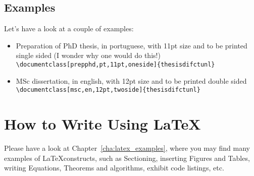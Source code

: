 \subsection{Examples} %
\label{ssec:examples}

Let's have a look at a couple of examples:

\begin{itemize}
	\item Preparation of PhD thesis, in portuguese, with 11pt size and to be printed single sided (I wonder why one would do this!)\\
	\verb!\documentclass[prepphd,pt,11pt,oneside]{thesisdifctunl}!
	\item MSc dissertation, in english, with 12pt size and to be printed double sided\\
	\verb!\documentclass[msc,en,12pt,twoside]{thesisdifctunl}!
\end{itemize}

\section{How to Write Using \LaTeX} %
\label{sec:how_to_write_using_latex}

Please have a look at Chapter~\ref{cha:latex_examples}, where you may find many examples of \LaTeX constructs, such as Sectioning, inserting Figures and Tables, writing Equations, Theorems and algorithms, exhibit code listings, etc.

